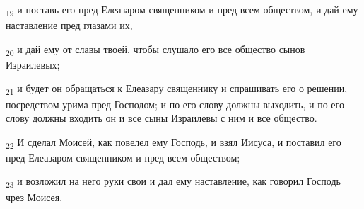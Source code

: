 \begin{tcolorbox}
\textsubscript{19} и поставь его пред Елеазаром священником и пред всем обществом, и дай ему наставление пред глазами их,
\end{tcolorbox}
\begin{tcolorbox}
\textsubscript{20} и дай ему от славы твоей, чтобы слушало его все общество сынов Израилевых;
\end{tcolorbox}
\begin{tcolorbox}
\textsubscript{21} и будет он обращаться к Елеазару священнику и спрашивать его о решении, посредством урима пред Господом; и по его слову должны выходить, и по его слову должны входить он и все сыны Израилевы с ним и все общество.
\end{tcolorbox}
\begin{tcolorbox}
\textsubscript{22} И сделал Моисей, как повелел ему Господь, и взял Иисуса, и поставил его пред Елеазаром священником и пред всем обществом;
\end{tcolorbox}
\begin{tcolorbox}
\textsubscript{23} и возложил на него руки свои и дал ему наставление, как говорил Господь чрез Моисея.
\end{tcolorbox}
